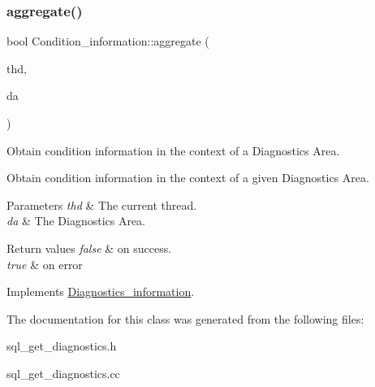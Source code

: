 \subsubsection{\texorpdfstring{aggregate()}{aggregate()}}
{\footnotesize\ttfamily bool Condition\+\_\+information\+::aggregate (\begin{DoxyParamCaption}\item[{T\+HD $\ast$}]{thd,  }\item[{const \mbox{\hyperlink{classDiagnostics__area}{Diagnostics\+\_\+area}} $\ast$}]{da }\end{DoxyParamCaption})\hspace{0.3cm}{\ttfamily [virtual]}}

Obtain condition information in the context of a Diagnostics Area.

Obtain condition information in the context of a given Diagnostics Area.


\begin{DoxyParams}{Parameters}
{\em thd} & The current thread. \\
\hline
{\em da} & The Diagnostics Area.\\
\hline
\end{DoxyParams}

\begin{DoxyRetVals}{Return values}
{\em false} & on success. \\
\hline
{\em true} & on error \\
\hline
\end{DoxyRetVals}


Implements \mbox{\hyperlink{classDiagnostics__information_a5181f11d3ef8554e1989a882bc2504dc}{Diagnostics\+\_\+information}}.



The documentation for this class was generated from the following files\+:\begin{DoxyCompactItemize}
\item 
sql\+\_\+get\+\_\+diagnostics.\+h\item 
sql\+\_\+get\+\_\+diagnostics.\+cc\end{DoxyCompactItemize}
